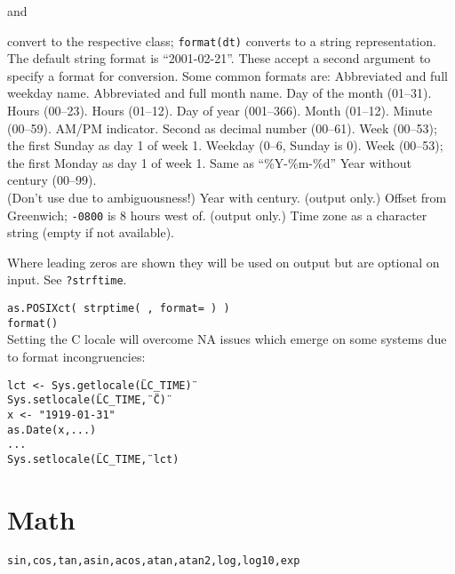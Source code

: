 	{and}

	{convert to the respective class; {\tt format(dt)} converts to a string representation. The default string format is ``2001-02-21''. These accept a second argument to specify a format for conversion. Some common formats are:}
	{Abbreviated and full \\weekday name.}
	{Abbreviated and full month name.}
	{Day of the month (01--31).}
	{Hours (00--23).}
	{Hours (01--12).}
	{Day of year (001--366).}
	{Month (01--12).}
	{Minute (00--59).}
	{AM/PM indicator. }
	{Second as decimal number (00--61).}
	{Week (00--53); the first Sunday as day 1 of week 1.}
	{Weekday (0--6, Sunday is 0).}
	{Week (00--53); the first Monday as day 1 of week 1.}
	{Same as ``\%Y-\%m-\%d''}
	{Year without century (00--99).\\(Don't use due to ambiguousness!)}
	{Year with century.}
	{(output only.) Offset from Greenwich; {\tt -0800} is 8 hours west of.}
	{(output only.) Time zone as a character
    string (empty if not available).}

Where leading zeros are shown they will be used on output but are
optional on input. See {\tt ?strftime}.

{\tt as.POSIXct( strptime( , format= ) )\\
    format()}\\

Setting the C locale will overcome NA issues which emerge on some systems due
to format incongruencies:

{\tt lct <- Sys.getlocale(\"LC\_TIME\")\\
Sys.setlocale(\"LC\_TIME\", \"C\")\\
x <- "1919-01-31"\\
as.Date(x,...)\\
...\\
Sys.setlocale(\"LC\_TIME\", lct)
}

\section{Math}{{\tt sin,cos,tan,asin,acos,atan,atan2,log,log10,exp}}


